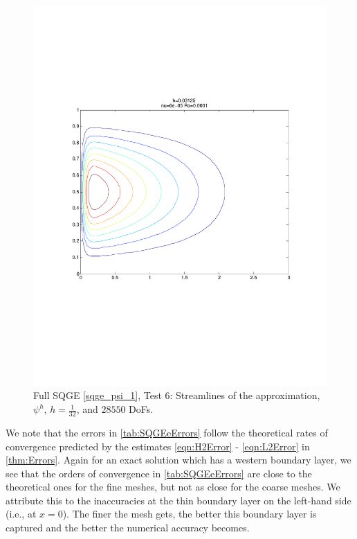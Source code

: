 \begin{figure}%
  \begin{center}
    \includegraphics[trim=0 200 20 215, clip=true, scale=0.5]{SQGEe.pdf}
    \caption{Full SQGE \eqref{sqge_psi_1}, Test 6: Streamlines of the approximation,
    $\psi^h$, $h=\frac{1}{32}$, and $28550$ DoFs.}
    \label{fig:SQGEe}
  \end{center}
\end{figure}

We note that the errors in \autoref{tab:SQGEeErrors} follow the theoretical rates of convergence
predicted by the estimates \eqref{eqn:H2Error} - \eqref{eqn:L2Error} in \autoref{thm:Errors}. Again
for an exact solution which has a western boundary layer, we see that the orders of convergence in \autoref{tab:SQGEeErrors} are close to the theoretical ones for the fine meshes, but
not as close for the coarse meshes. We attribute this to the inaccuracies at the thin boundary layer
on the left-hand side (i.e., at $x=0$). The finer the mesh gets, the better this boundary layer is
captured and the better the numerical accuracy becomes.

